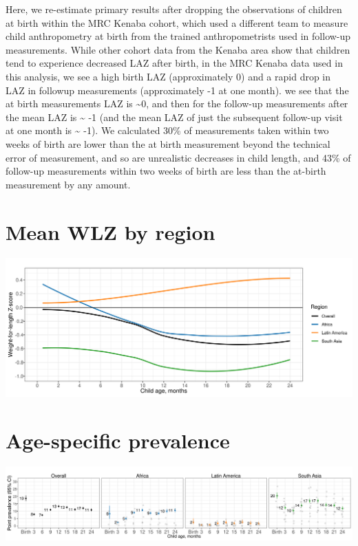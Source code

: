 \documentclass[
  9pt,
]{book}
\begin{document}
Here, we re-estimate primary results after dropping the observations of children at birth within the MRC Kenaba cohort, which used a different team to measure child anthropometry at birth from the trained anthropometrists used in follow-up measurements. While other cohort data from the Kenaba area show that children tend to experience decreased LAZ after birth, in the MRC Kenaba data used in this analysis, we see a high birth LAZ (approximately 0) and a rapid drop in LAZ in followup measurements (approximately -1 at one month).
we see that the at birth measurements LAZ is \textasciitilde0, and then for the follow-up measurements after the mean LAZ is \textasciitilde{} -1 (and the mean LAZ of just the subsequent follow-up visit at one month is \textasciitilde{} -1). We calculated 30\% of measurements taken within two weeks of birth are lower than the at birth measurement beyond the technical error of measurement, and so are unrealistic decreases in child length, and 43\% of follow-up measurements within two weeks of birth are less than the at-birth measurement by any amount.

\hypertarget{mean-wlz-by-region}{%
\section{Mean WLZ by region}\label{mean-wlz-by-region}}

\includegraphics[width=41.67in]{figures//wasting/no-kenaba-bw/WLZ_by_region-no-Kenaba-BW}

\hypertarget{age-specific-prevalence-2}{%
\section{Age-specific prevalence}\label{age-specific-prevalence-2}}

\includegraphics[width=58.33in]{figures//wasting/no-kenaba-bw/fig-wast-prev-no-Kenaba-BW}
\end{document}
